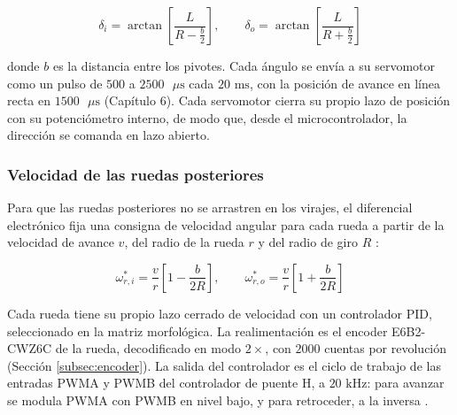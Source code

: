 \documentclass[../../General.tex]{subfiles}
\begin{document}
\begin{equation}\label{eq:ackermann_control}
    \delta_i = \arctan \left[ \frac{L}{R - \frac{b}{2}} \right], \qquad \delta_o = \arctan \left[ \frac{L}{R + \frac{b}{2}} \right]
\end{equation}

donde $b$ es la distancia entre los pivotes. Cada ángulo se envía a su servomotor como un pulso de $500$ a $2500\text{ }\mu\text{s}$ cada $20\text{ ms}$, con la posición de avance en línea recta en $1500\text{ }\mu\text{s}$ (Capítulo 6). Cada servomotor cierra su propio lazo de posición con su potenciómetro interno, de modo que, desde el microcontrolador, la dirección se comanda en lazo abierto.

\subsubsection{Velocidad de las ruedas posteriores}

Para que las ruedas posteriores no se arrastren en los virajes, el diferencial electrónico fija una consigna de velocidad angular para cada rueda a partir de la velocidad de avance $v$, del radio de la rueda $r$ y del radio de giro $R$ \citep{siegwart2004mobile, jazar2017vehicle}:

\begin{equation}\label{eq:diferencial_control}
    \omega_{r,i}^{*} = \frac{v}{r} \left[ 1 - \frac{b}{2R} \right], \qquad \omega_{r,o}^{*} = \frac{v}{r} \left[ 1 + \frac{b}{2R} \right]
\end{equation}

Cada rueda tiene su propio lazo cerrado de velocidad con un controlador PID, seleccionado en la matriz morfológica. La realimentación es el encoder E6B2-CWZ6C de la rueda, decodificado en modo $2\times$, con $2000$ cuentas por revolución (Sección \ref{subsec:encoder}). La salida del controlador es el ciclo de trabajo de las entradas PWMA y PWMB del controlador de puente H, a $20\text{ kHz}$: para avanzar se modula PWMA con PWMB en nivel bajo, y para retroceder, a la inversa \citep{pololu_h2_36v11}.
\end{document}
